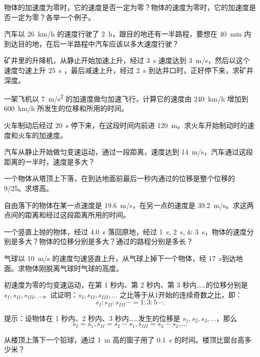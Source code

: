 \begin{Exercise}
\begin{question}
	\item 物体的加速度为零时，它的速度是否一定为零？物体的速度为零时，它的加速度是否一定为零？各举一个例子。
	\item 汽车以 \qty{26}{km/h} 的速度行驶了 \qty{2}{h}，跟目的地还有一半路程，要想在 \qty{40}{min} 内到达目的地，在后一半路程中汽车应该以多大速度行驶？
	\item 矿井里的升降机，从静止开始加速上升，经过 \qty{3}{s} 速度达到 \qty{3}{m/s}，然后以这个速度匀速上升 \qty{25}{s} ，最后减速上升，经过 \qty{2}{s} 到达井口时，正好停下来，求矿井深度。
	\item 一架飞机以 \qty{7}{m/s^2} 的加速度做匀加速飞行，计算它的速度由 \qty{240}{km/h} 增加到 \qty{600}{km/h} 所发生的位移和所用的时间。
	\item 火车制动后经过 \qty{20}{s} 停下来，在这段时间内前进 \qty{120}{m}。求火车开始制动时的速度和火车的加速度。
	\item 汽车从静止开始做匀变速运动，通过一段距离，速度达到 \qty{14}{m/s}，汽车通过这段距离的一半时，速度是多大？
	\item 一个物体从塔顶上下落，在到达地面前最后一秒内通过的位移是整个位移的 9/25。求塔高。
	\item 自由落下的物体在某一点速度是 \qty{19.6}{m/s}，在另一点的速度是 \qty{39.2}{m/s}。求这两点间的距离和经过这段距离所用的时间。
	\item 一个竖直上抛的物体，经过 \qty{4.0}{s} 落回原地，经过 \qtylist{1;2;3}{s}，物体的速度分别是多大？物体的位移分别是多大？通过的路程分别是多长？
	\item 气球以 \qty{10}{m/s} 的速度匀速竖直上升，从气球上掉下一个物体，经 \qty{17}{s}到达地面。求物体刚脱离气球时气球的高度。
	\item 初速度为零的匀变速运动，在第 1 秒内、第 2 秒内、第 
	3 秒内……的位移分别是 $s_I,s_{II},s_{III},\ldots$。试证明：$s_I,s_{II},s_{III},\ldots$ 之比等于从1开始的连续奇数之比，即：
\[s_I:s_{II}:s_{III}\cdots=1:3:5\cdots.\]

\noindent 提示：设物体在 1 秒内、2 秒内、3 秒内……发生的位移是 $s_1,s_2,s_3,\ldots$，那么 $$s_I=s_1, s_{II}=s_2-s_1, s_{III}=s_3-s_2,\ldots$$
	\item 从楼顶上落下一个铅球，通过 \qty{1}{m} 高的窗子用了 \qty{0.1}{s} 的时间。楼顶比窗台高多少米？
\end{question}
\end{Exercise}